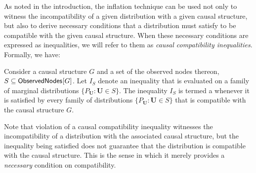 As noted in the introduction, the inflation technique can be used not only to witness the incompatibility of a given distribution with a given causal structure, but also to derive necessary conditions that a distribution must satisfy to be compatible with the given causal structure.   When these necessary conditions are expressed as inequalities, we will refer to them as {\em causal compatibility inequalities}.  Formally, we have:
\begin{definition}

Consider a causal structure $G$ and a set of the observed nodes thereon, $S \subseteq {\operatorname{\mathsf{ObservedNodes}}_{}}\lbrack G\rbrack$.  Let $I_S$ denote an inequality that is evaluated on a family of marginal distributions  $\{ P_{\bm{U}}: \bm{U} \in S\}$.  The inequality $I_S$ is termed a  whenever it is satisfied by every family of distributions $\{ P_{\bm{U}}: \bm{U} \in S\}$ that is compatible with the causal structure $G$.
\end{definition}
Note that violation of a causal compatibility inequality witnesses the incompatibility of a distribution with the associated causal structure, but the inequality being satisfied does not guarantee that the distribution is compatible with the causal structure.  This is the sense in which it merely provides a {\em necessary} condition on compatibility. 

